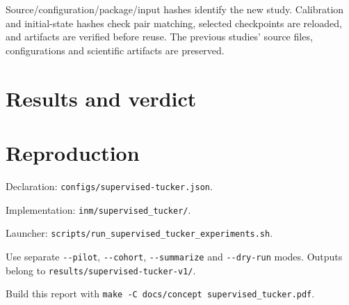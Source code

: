 \documentclass[11pt,a4paper]{article}
\newcommand{\code}[1]{{\small\nolinkurl{#1}}}
\begin{document}
Source/configuration/package/input hashes identify the new study. Calibration
and initial-state hashes check pair matching, selected checkpoints are reloaded,
and artifacts are verified before reuse. The previous studies' source files,
configurations and scientific artifacts are preserved.

\section{Results and verdict}


\section{Reproduction}
Declaration: \code{configs/supervised-tucker.json}.

Implementation: \code{inm/supervised_tucker/}.

Launcher: \code{scripts/run_supervised_tucker_experiments.sh}.

Use separate \code{--pilot}, \code{--cohort}, \code{--summarize} and
\code{--dry-run} modes.
Outputs belong to \code{results/supervised-tucker-v1/}.

Build this report with \verb|make -C docs/concept supervised_tucker.pdf|.
\end{document}
